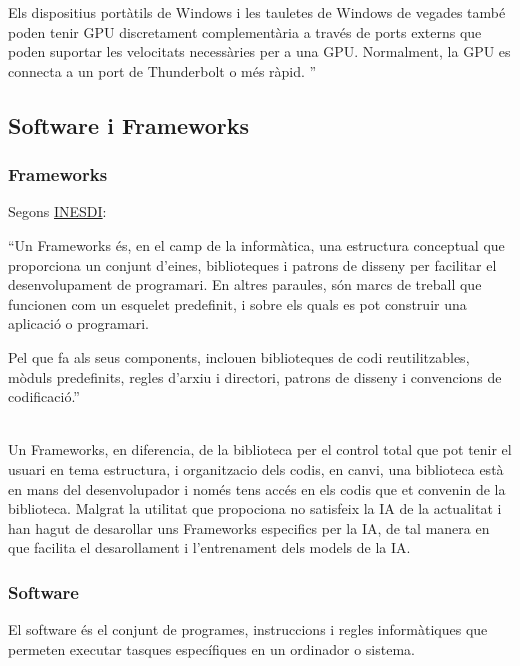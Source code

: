 {\begin{itemize}
   Els dispositius portàtils de Windows i les tauletes de Windows de vegades també poden tenir GPU discretament complementària a través de ports externs que poden suportar les velocitats necessàries per a una GPU. Normalment, la GPU es connecta a un port de Thunderbolt o més ràpid. ''

  \end{itemize}

}



\subsection{Software i Frameworks}\label{subsec:Software i Frameworks}

\subsubsection{Frameworks}
Segons \href{https://www.inesdi.com/blog/Frameworks-de-IA-que-debes-conocer/}{INESDI}:\\
{\color{gray}``Un Frameworks és, en el camp de la informàtica, una estructura conceptual que proporciona un conjunt d'eines, biblioteques i patrons de disseny per facilitar el desenvolupament de programari. En altres paraules, són marcs de treball que funcionen com un esquelet predefinit, i sobre els quals es pot construir una aplicació o programari.

Pel que fa als seus components, inclouen biblioteques de codi reutilitzables, mòduls predefinits, regles d'arxiu i directori, patrons de disseny i convencions de codificació.''}\\

Un Frameworks, en diferencia, de la biblioteca per el control total que pot tenir el usuari en tema estructura, i organitzacio dels codis, en canvi, una biblioteca està en mans del desenvolupador i només tens accés en els codis que et convenin de la biblioteca. Malgrat la utilitat que propociona no satisfeix la IA de la actualitat i han hagut de desarollar uns Frameworks especifics per la IA, de tal manera en que facilita el desarollament i l'entrenament dels models de la IA.
\subsubsection{Software}
El software és el conjunt de programes, instruccions i regles informàtiques que permeten executar tasques específiques en un ordinador o sistema.


